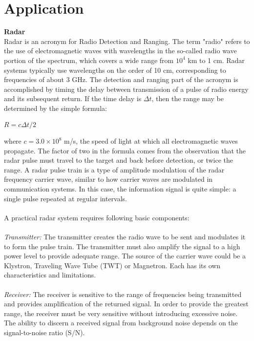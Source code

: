 \documentclass[a4paper,12pt]{report}
\begin{document}
\chapter{Application}
\textbf{Radar}\\
 Radar is an acronym for Radio Detection and Ranging.  The term "radio"  
 refers to the use of electromagnetic waves with wavelengths in the so-called radio 
 wave portion of the spectrum, which covers a wide range from $10^{4}$ km to 1 cm.  Radar 
 systems typically use wavelengths on the order of 10 cm, corresponding to frequencies 
 of about 3 GHz.  The detection and ranging part of the acronym is accomplished by 
 timing the delay between transmission of a pulse of radio energy and its subsequent 
 return.  If the time delay is $\Delta$$ t$, then the range may be determined by the simple 
 formula:
\begin{center}
	$R=c\Delta t/2$
\end{center}
where $c=3.0\times10^{8}$ m/s, the speed of light at which all electromagnetic waves propagate.
The factor of two in the formula comes from the observation that the radar pulse must 
travel to the target and back before detection, or twice the range. A radar pulse train is a type of amplitude modulation of the radar frequency  
carrier wave, similar to how carrier waves are modulated in communication systems.  
In this case, the information signal is quite simple:  a single pulse repeated at 
regular intervals.\\\\
A practical radar system requires following basic components:\\\\
\textit{Transmitter:} The transmitter creates the radio wave to be sent and modulates it to form the pulse train.  The transmitter must also amplify the signal to a high power level to provide adequate range.  The source of the carrier wave could be a Klystron, Traveling Wave Tube (TWT) or Magnetron.  Each has its own characteristics and limitations.\\\\
\textit{Receiver:} The receiver is sensitive to the range of frequencies being transmitted and provides amplification of the returned signal. In order to provide the greatest range, the receiver must be very sensitive without introducing excessive noise.  The ability to discern a received signal from background noise depends on the signal-to-noise ratio (S/N).\\\\ 
$$
\end{document}
